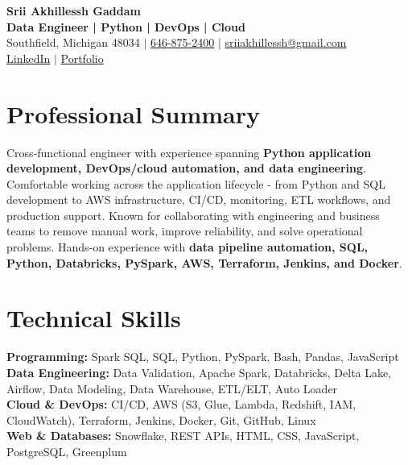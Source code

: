 \documentclass[letterpaper,10pt]{article}
\begin{document}
\fontsize{9.35pt}{10.45pt}\selectfont

\begin{center}
    {\LARGE \textbf{Srii Akhillessh Gaddam}} \\[-1pt]
    \textbf{Data Engineer | Python | DevOps | Cloud} \\[2pt]
    Southfield, Michigan 48034 $|$
    \href{tel:6468752400}{646-875-2400} $|$
    \href{mailto:sriiakhillessh@gmail.com}{sriiakhillessh@gmail.com} \\[1pt]
    \href{https://www.linkedin.com/in/srii-akhiilessh-gaddam-b48668191/}{LinkedIn} $|$
    \href{https://sriiakhillesshg.github.io/portfolio/}{Portfolio}
\end{center}
\vspace{-8pt}

\section{Professional Summary}
\small{Cross-functional engineer with experience spanning \textbf{Python application development, DevOps/cloud automation, and data engineering}. Comfortable working across the application lifecycle - from Python and SQL development to AWS infrastructure, CI/CD, monitoring, ETL workflows, and production support. Known for collaborating with engineering and business teams to remove manual work, improve reliability, and solve operational problems. Hands-on experience with \textbf{data pipeline automation, SQL, Python, Databricks, PySpark, AWS, Terraform, Jenkins, and Docker}.}

\section{Technical Skills}
\small{
\textbf{Programming:} Spark SQL, SQL, Python, PySpark, Bash, Pandas, JavaScript \\
\textbf{Data Engineering:} Data Validation, Apache Spark, Databricks, Delta Lake, Airflow, Data Modeling, Data Warehouse, ETL/ELT, Auto Loader \\
\textbf{Cloud \& DevOps:} CI/CD, AWS (S3, Glue, Lambda, Redshift, IAM, CloudWatch), Terraform, Jenkins, Docker, Git, GitHub, Linux \\
\textbf{Web \& Databases:} Snowflake, REST APIs, HTML, CSS, JavaScript, PostgreSQL, Greenplum
}
\end{document}
